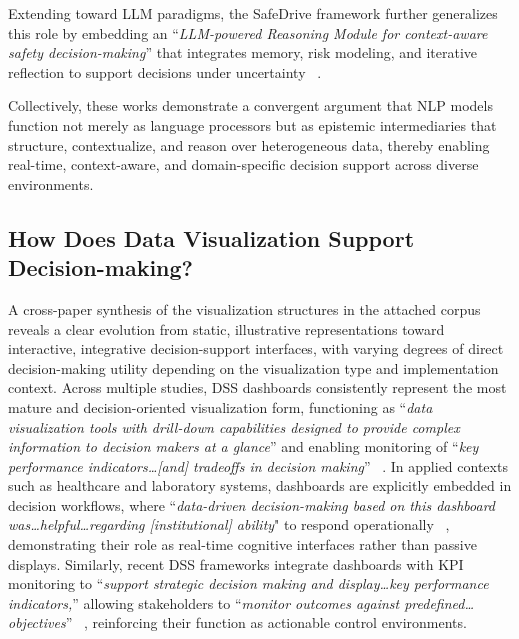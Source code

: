 \documentclass{sfuthesis}
\begin{document}
Extending toward LLM paradigms, the SafeDrive framework further generalizes this role by embedding an “\textit{LLM-powered Reasoning Module for context-aware safety decision-making}” that integrates memory, risk modeling, and iterative reflection to support decisions under uncertainty ~\cite{zhou2026safedrive}.\par
Collectively, these works demonstrate a convergent argument that NLP models function not merely as language processors but as epistemic intermediaries that structure, contextualize, and reason over heterogeneous data, thereby enabling real-time, context-aware, and domain-specific decision support across diverse environments.

\subsection{How Does Data Visualization Support Decision-making?}
A cross-paper synthesis of the visualization structures in the attached corpus reveals a clear evolution from static, illustrative representations toward interactive, integrative decision-support interfaces, with varying degrees of direct decision-making utility depending on the visualization type and implementation context. Across multiple studies, DSS dashboards consistently represent the most mature and decision-oriented visualization form, functioning as “\textit{data visualization tools with drill-down capabilities designed to provide complex information to decision makers at a glance}” and enabling monitoring of “\textit{key performance indicators…[and] tradeoffs in decision making}” ~\cite{weiner_integrating_2015}. In applied contexts such as healthcare and laboratory systems, dashboards are explicitly embedded in decision workflows, where “\textit{data-driven decision-making based on this dashboard was…helpful…regarding [institutional] ability}" to respond operationally ~\cite{Dahl2022PathologyLaboratories}, demonstrating their role as real-time cognitive interfaces rather than passive displays. Similarly, recent DSS frameworks integrate dashboards with KPI monitoring to “\textit{support strategic decision making and display…key performance indicators,}” allowing stakeholders to “\textit{monitor outcomes against predefined…objectives}” ~\cite{DelaCal2026CulturalTourism}, reinforcing their function as actionable control environments.\par
\end{document}
